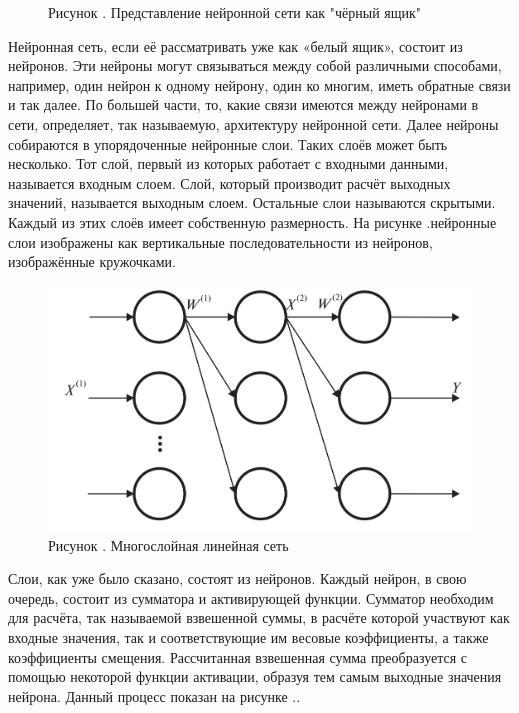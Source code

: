 {	\begin{figure}
		\centering
		\def\svgwidth{\textwidth}
		
		\caption*{\gostFont Рисунок \thechaptercntr .\theimagecntr \spc {--} Представление нейронной сети как "чёрный ящик"}
		\label{fig:NNBlackBox}
	\end{figure} \addtocounter{imagecntr}{1}
	
	\par \redline Нейронная сеть, если её рассматривать уже как «белый ящик», состоит из нейронов. Эти нейроны могут связываться между собой различными способами, например, один нейрон к одному нейрону, один ко многим, иметь обратные связи и так далее. По большей части, то, какие связи имеются между нейронами в сети, определяет, так называемую, архитектуру нейронной сети. Далее нейроны собираются в упорядоченные нейронные слои. Таких слоёв может быть несколько. Тот слой, первый из которых работает с входными данными, называется входным слоем. Слой, который производит расчёт выходных значений, называется выходным слоем. Остальные слои называются скрытыми. Каждый из этих слоёв имеет собственную размерность. На рисунке \thechaptercntr.\theimagecntr \spc нейронные слои изображены как вертикальные последовательности из нейронов, изображённые кружочками.
	
	\begin{figure}
		\centering
		\def\svgwidth{\textwidth}
		\includegraphics[width=\textwidth]{images/neural_net.png}
		\caption*{\gostFont Рисунок \thechaptercntr .\theimagecntr \spc {--} Многослойная линейная сеть}
		\label{fig:NNWhiteBox}
	\end{figure} \addtocounter{imagecntr}{1}
	
  \par \redline Слои, как уже было сказано, состоят из нейронов. Каждый нейрон, в свою очередь, состоит из сумматора и активирующей функции. Сумматор необходим для расчёта, так называемой взвешенной суммы, в расчёте которой участвуют как входные значения, так и соответствующие им весовые коэффициенты, а также коэффициенты смещения. Рассчитанная взвешенная сумма преобразуется с помощью некоторой функции активации, образуя тем самым выходные значения нейрона. Данный процесс показан на рисунке \thechaptercntr .\theimagecntr.

}
